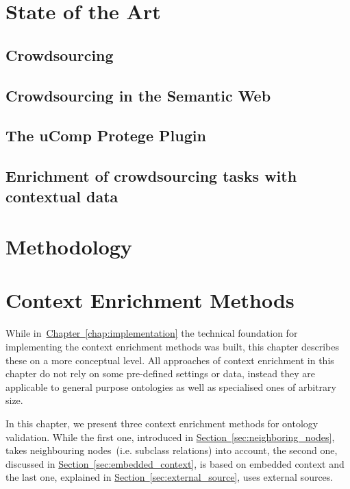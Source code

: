 \documentclass[draft,final]{vutinfth} %
\begin{document}
\chapter{State of the Art}
\section{Crowdsourcing}
\section{Crowdsourcing in the Semantic Web}
\section{The uComp Protege Plugin}
\section{Enrichment of crowdsourcing tasks with contextual data}



\chapter{Methodology}



\chapter{Context Enrichment Methods}\label{chap:context_enrichment_methods}
While in~\hyperref[chap:implementation]{Chapter~\ref*{chap:implementation}} the technical foundation for implementing the context enrichment methods was built, this chapter describes these on a more conceptual level. All approaches of context enrichment in this chapter do not rely on some pre-defined settings or data, instead they are applicable to general purpose ontologies as well as specialised ones of arbitrary size.

In this chapter, we present three context enrichment methods for ontology validation. While the first one, introduced in \hyperref[sec:neighboring_nodes]{Section~\ref*{sec:neighboring_nodes}}, takes neighbouring nodes~(i.e. subclass relations) into account, the second one, discussed in \hyperref[sec:embedded_context]{Section~\ref*{sec:embedded_context}}, is based on embedded context and the last one, explained in \hyperref[sec:external_source]{Section~\ref*{sec:external_source}}, uses external sources. 
\end{document}

